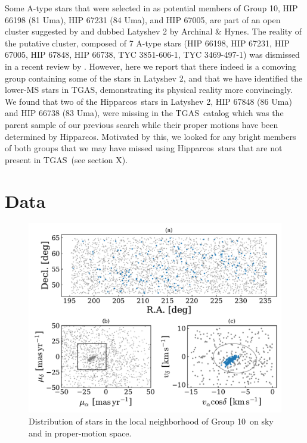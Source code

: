 \documentclass[modern,letterpaper]{aastex61}
\newcommand{\acronym}[1]{{\small{#1}}}
\newcommand{\hipparcos}{Hipparcos}
\newcommand{\tgas}{\acronym{TGAS}}
\newcommand{\groupTen}{Group 10}
\newcommand{\todo}[1]{{\color{crimson}#1}}
\begin{document}
Some A-type stars that were selected in \citet{2017AJ....153..257O} as potential
members of \groupTen,
HIP 66198 (81 Uma), HIP 67231 (84 Uma), and HIP 67005, are part of an open cluster
suggested by \citet{1977ATsir.969....7L} and dubbed Latyshev 2 by Archinal \& Hynes.
The reality of the putative cluster, composed of 7 A-type stars
(HIP 66198,
HIP 67231,
HIP 67005,
HIP 67848,
HIP 66738,
TYC 3851-606-1,
TYC 3469-497-1)
was dismissed in a recent review by \citet{2016IAUS..314...21M}.
However, here we report that there indeed is a comoving group containing
some of the stars in Latyshev 2, and that we have identified the lower-MS stars
in \tgas, demonstrating its physical reality more convincingly.
We found that two of the \hipparcos\ stars in Latyshev 2,
HIP 67848 (86 Uma) and HIP 66738 (83 Uma),
were missing in the \tgas\ catalog which was the parent sample of our previous search while
their proper motions have been determined by \hipparcos.
Motivated by this, we looked for any bright members of both groups that we
may have missed using \hipparcos\ stars that are not present in \tgas\ (\todo{see section X}).


\section{Data}
\label{sec:data}

\begin{figure}
  \includegraphics[width=0.95\linewidth]{g10_sky_pm.pdf}
  \caption{Distribution of stars in the local neighborhood of \groupTen\ on sky and in proper-motion space.}
  \label{fig:distributions}
\end{figure}
\end{document}
